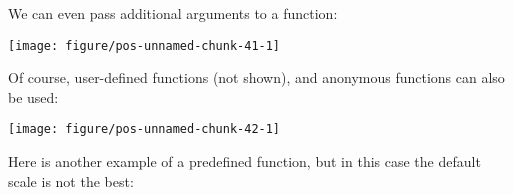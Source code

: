 \documentclass[paper=a4,10pt,div=17,headsepline,BCOR=12mm,twoside,open=right]{scrbook}\usepackage{knitr}
\begin{document}
We can even pass additional arguments to a function:

\begin{knitrout}\footnotesize
{}\color{fgcolor}\begin{kframe}
\begin{alltt}
\hlstd{(}\hlstd{(}\hlstd{=}\hlopt{-}\hlopt{:}\hlstd{),} \hlstd{(} \hlopt{+}
  \hlstd{(}   \hlstd{=} \hlstd{(} \hlstd{=} \hlstd{,}  \hlstd{=} \hlstd{))}
\end{alltt}
\end{kframe}

{\centering \texttt{[image: figure/pos-unnamed-chunk-41-1]} 

}



\end{knitrout}

Of course, user-defined functions (not shown), and anonymous functions can also be used:

\begin{knitrout}\footnotesize
{}\color{fgcolor}\begin{kframe}
\begin{alltt}
\hlstd{(}\hlstd{(}\hlstd{=}\hlopt{:}\hlstd{),} \hlstd{(} \hlopt{+}
  \hlstd{(} \hlstd{=} \hlstd{(}\hlstd{,} \hlstd{,}  \hlopt{+}  \hlopt{*} \hlopt{^}\hlstd{\},}
                 \hlstd{=} \hlstd{(} \hlstd{=} \hlstd{,}  \hlstd{=} \hlstd{))}
\end{alltt}
\end{kframe}

{\centering \texttt{[image: figure/pos-unnamed-chunk-42-1]} 

}



\end{knitrout}

Here is another example of a predefined function, but in this case the default scale is not the best:
\end{document}
